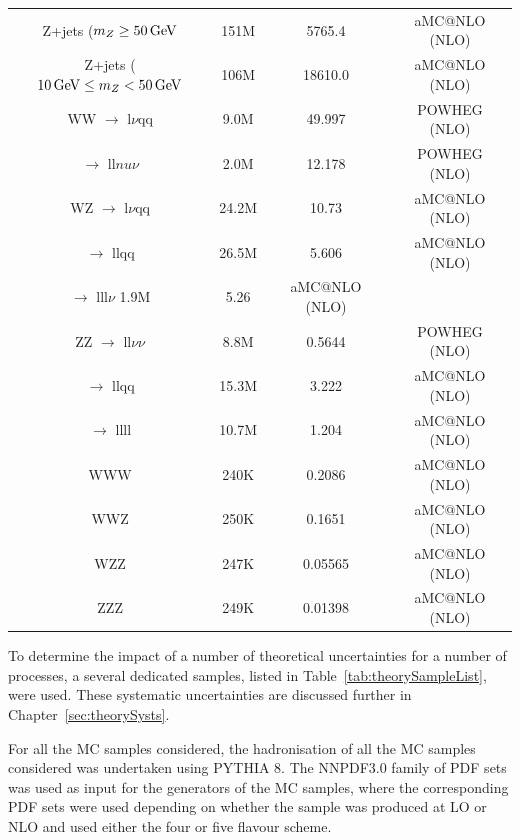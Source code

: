 \begin{table}[htbp]
{\begin{tabular}{cccc}
   \hline
   Z+jets ($m_{Z} \geq 50\,\text{Ge\hspace{-.08em}V} $ & 151M & 5765.4 & aMC@NLO (NLO) \\
   Z+jets ($10 \,\text{Ge\hspace{-.08em}V} \leq m_{Z} < 50\,\text{Ge\hspace{-.08em}V}$ & 106M & 18610.0 & aMC@NLO (NLO) \\
   \hline
   WW $\rightarrow$ l$\nu$qq & 9.0M & 49.997  & POWHEG (NLO) \\
      $\rightarrow$ ll$nu\nu$ & 2.0M & 12.178 & POWHEG (NLO) \\
   \hline
   WZ $\rightarrow$ l$\nu$qq & 24.2M & 10.73 & aMC@NLO (NLO) \\
      $\rightarrow$ llqq & 26.5M & 5.606 & aMC@NLO (NLO) \\
      $\rightarrow$ lll$\nu$ 1.9M & 5.26 & aMC@NLO (NLO) \\
   \hline
   ZZ $\rightarrow$ ll$\nu\nu$ & 8.8M & 0.5644 & POWHEG (NLO) \\
      $\rightarrow$ llqq & 15.3M & 3.222 & aMC@NLO (NLO) \\
      $\rightarrow$ llll & 10.7M & 1.204 & aMC@NLO (NLO) \\
   \hline
   WWW & 240K & 0.2086 & aMC@NLO (NLO) \\
   \hline
   WWZ & 250K & 0.1651 & aMC@NLO (NLO) \\
   \hline
   WZZ & 247K & 0.05565 & aMC@NLO (NLO) \\
   \hline
   ZZZ & 249K & 0.01398 & aMC@NLO (NLO) \\
   \hline
   
 \end{tabular}}
\end{table}

To determine the impact of a number of theoretical uncertainties for a number of processes, a several dedicated samples, listed in Table~\ref{tab:theorySampleList}, were used.
These systematic uncertainties are discussed further in Chapter~\ref{sec:theorySysts}.

For all the MC samples considered, the hadronisation of all the MC samples considered was undertaken using PYTHIA 8.
The NNPDF3.0 family of PDF sets was used as input for the generators of the MC samples, where the corresponding PDF sets were used depending on whether the sample was produced at LO or NLO and used either the four or five flavour scheme.

